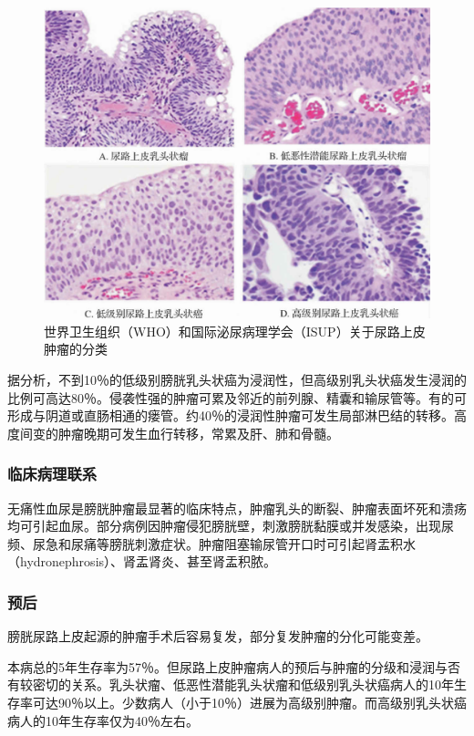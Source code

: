\begin{figure}[!htbp]
 \centering
 \includegraphics{./images/Image00184.jpg}
 \captionsetup{justification=centering}
 \caption{世界卫生组织（WHO）和国际泌尿病理学会（ISUP）关于尿路上皮肿瘤的分类}
 \label{fig10-35}
  \end{figure} 

据分析，不到10％的低级别膀胱乳头状癌为浸润性，但高级别乳头状癌发生浸润的比例可高达80％。侵袭性强的肿瘤可累及邻近的前列腺、精囊和输尿管等。有的可形成与阴道或直肠相通的瘘管。约40％的浸润性肿瘤可发生局部淋巴结的转移。高度间变的肿瘤晚期可发生血行转移，常累及肝、肺和骨髓。

\subsubsection{临床病理联系}

无痛性血尿是膀胱肿瘤最显著的临床特点，肿瘤乳头的断裂、肿瘤表面坏死和溃疡均可引起血尿。部分病例因肿瘤侵犯膀胱壁，刺激膀胱黏膜或并发感染，出现尿频、尿急和尿痛等膀胱刺激症状。肿瘤阻塞输尿管开口时可引起肾盂积水（hydronephrosis）、肾盂肾炎、甚至肾盂积脓。

\subsubsection{预后}

膀胱尿路上皮起源的肿瘤手术后容易复发，部分复发肿瘤的分化可能变差。

本病总的5年生存率为57％。但尿路上皮肿瘤病人的预后与肿瘤的分级和浸润与否有较密切的关系。乳头状瘤、低恶性潜能乳头状瘤和低级别乳头状癌病人的10年生存率可达90％以上。少数病人（小于10％）进展为高级别肿瘤。而高级别乳头状癌病人的10年生存率仅为40％左右。

